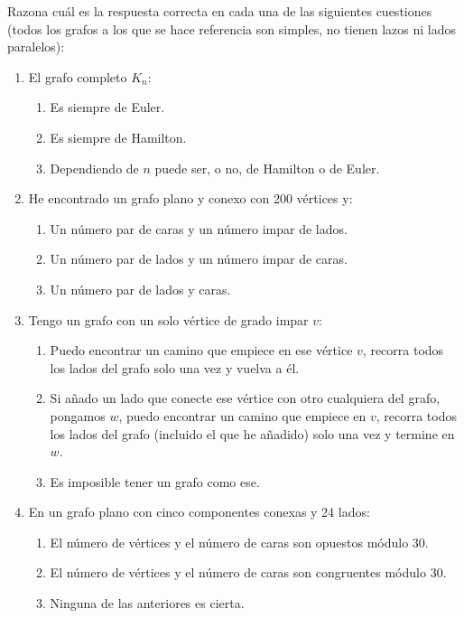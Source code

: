 \begin{ejercicio}\label{ej:1.25}
    Razona cuál es la respuesta correcta en cada una de las siguientes cuestiones (todos los grafos a los que se hace referencia son simples, no tienen lazos ni lados paralelos):
    \begin{enumerate}
        \item El grafo completo $K_n$:
        \begin{enumerate}
            \item Es siempre de Euler.
            \item Es siempre de Hamilton.
            \item Dependiendo de $n$ puede ser, o no, de Hamilton o de Euler.
        \end{enumerate}
        \item He encontrado un grafo plano y conexo con 200 vértices y:
        \begin{enumerate}
            \item Un número par de caras y un número impar de lados.
            \item Un número par de lados y un número impar de caras.
            \item Un número par de lados y caras.
        \end{enumerate}
        \item Tengo un grafo con un solo vértice de grado impar $v$:
        \begin{enumerate}
            \item Puedo encontrar un camino que empiece en ese vértice $v$, recorra todos los lados del grafo solo una vez y vuelva a él.
            \item Si añado un lado que conecte ese vértice con otro cualquiera del grafo, pongamos $w$, puedo encontrar un camino que empiece en $v$, recorra todos los lados del grafo (incluido el que he añadido) solo una vez y termine en $w$.
            \item Es imposible tener un grafo como ese.
        \end{enumerate}
        \item En un grafo plano con cinco componentes conexas y 24 lados:
        \begin{enumerate}
            \item El número de vértices y el número de caras son opuestos módulo 30.
            \item El número de vértices y el número de caras son congruentes módulo 30.
            \item Ninguna de las anteriores es cierta.

\end{enumerate}
\end{enumerate}
\end{ejercicio}
